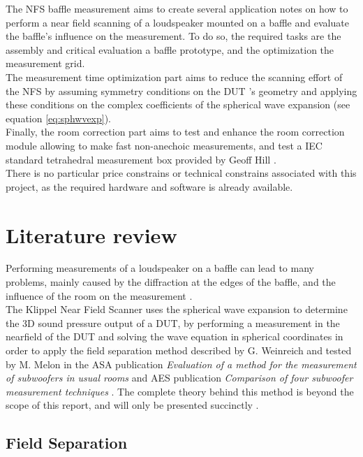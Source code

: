 \documentclass{report}
\begin{document}
The NFS baffle measurement aims to create several application notes on how to perform a near field scanning of a loudspeaker mounted on a baffle and evaluate the baffle's influence on the measurement. To do so, the required tasks are the assembly and critical evaluation a baffle prototype, and the optimization the measurement grid.\\

The measurement time optimization part aims to reduce the scanning effort of the NFS by assuming symmetry conditions on the DUT 's geometry and applying these conditions on the complex coefficients of the spherical wave expansion (see equation \ref{eq:sphwvexp}). \\

Finally, the room correction part aims to test and enhance the room correction module allowing to make fast non-anechoic measurements, and test a IEC standard tetrahedral measurement box provided by Geoff Hill \citep[see][]{tetbox}. \\

There is no particular price constrains or technical constrains associated with this project, as the required hardware and software is already available. 

\newpage

\section{Literature review}

Performing measurements of a loudspeaker on a baffle can lead to many problems, mainly caused by the diffraction at the edges of the baffle, and the influence of the room on the measurement \cite{LIS}.\\
The Klippel Near Field Scanner uses the spherical wave expansion to determine the 3D sound pressure output of a DUT, by performing a measurement in the nearfield of the DUT and solving the wave equation in spherical coordinates in order to apply the field separation method described by G. Weinreich and tested by M. Melon in the ASA publication \textit{Evaluation of a method for the measurement of subwoofers in usual rooms} and AES publication \textit{Comparison of four subwoofer measurement techniques}  \cite{melon1, melon2}. The complete theory behind this method is beyond the scope of this report, and will only be presented succinctly  \citep[see][sect.~3]{aeshs} \citep[see][chap.~6]{Fourier}. 

\subsection{Field Separation}
\label{sec:FieldSep}
\end{document}

